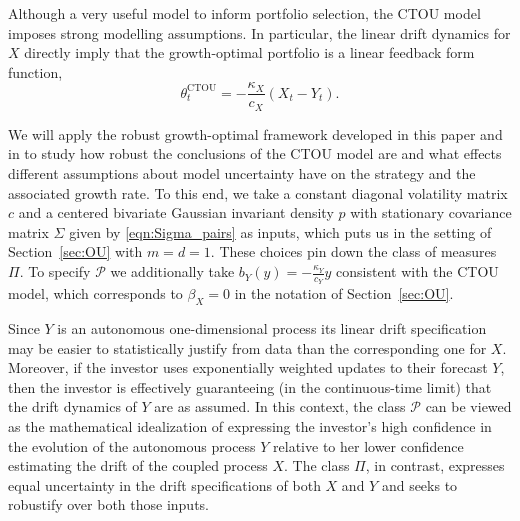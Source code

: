 \documentclass{article}
\theoremstyle{plain}
\theoremstyle{definition}
\newcommand{\Pcal}{{\mathcal P}}
\numberwithin{lem}{section}
\begin{document}

Although a very useful model to inform portfolio selection, the CTOU model imposes strong modelling assumptions. In particular, the linear drift dynamics for $X$ directly imply that the growth-optimal portfolio is a linear feedback form function,
\[\theta^{\mathrm{CTOU}}_t = -\frac{\kappa_X}{c_X}(X_t-Y_t).\]

  We will apply the robust growth-optimal framework developed in this paper and in \cite{itkin2025ergodic} to study how robust the conclusions of the CTOU model are and what effects different assumptions about model uncertainty have on the strategy and the associated growth rate. To this end, we take a constant diagonal volatility matrix $c$ and a centered bivariate Gaussian invariant density $p$ with stationary covariance matrix $\Sigma$ given by \eqref{eqn:Sigma_pairs} as inputs, which puts us in the setting of Section~\ref{sec:OU} with $m=d=1$. These choices pin down the class of measures $\Pi$. To specify $\Pcal$ we additionally take $b_Y(y) = - \frac{\kappa_Y}{c_Y}y$ consistent with the CTOU model, which corresponds to $\beta_X = 0$ in the notation of Section~\ref{sec:OU}. 
  
  Since $Y$ is an autonomous one-dimensional process its  linear drift specification may be easier to statistically justify from data than the corresponding one for $X$. Moreover, if the investor uses exponentially weighted updates to their forecast $Y$, then the investor is effectively guaranteeing  (in the continuous-time limit) that the drift dynamics of $Y$ are as assumed. In this context, the class $\Pcal$ can be viewed as the mathematical idealization of expressing the investor's high confidence in the evolution of the autonomous process $Y$ relative to her lower confidence estimating the drift of the coupled process $X$. The class $\Pi$, in contrast, expresses equal uncertainty in the drift specifications of both $X$ and $Y$ and seeks to robustify over both those inputs.
\end{document}
